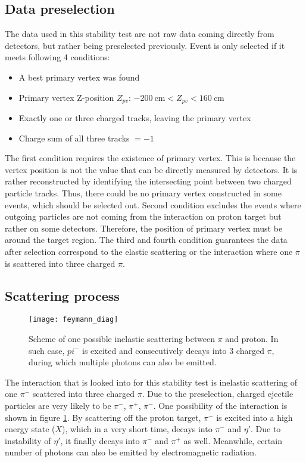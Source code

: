 \subsection{Data preselection}
\label{subsec:data_preselection}
The data used in this stability test are not raw data coming directly from detectors, but rather being preselected previously. Event is only selected if it meets following 4 conditions: 
\begin{itemize}
	\item A best primary vertex was found
	\item Primary vertex Z-position $Z_{pv}$: $\SI{-200}{\centi\meter} < Z_{pv} < \SI{160}{\centi\meter}$
	\item Exactly one or three charged tracks, leaving the primary vertex
	\item Charge sum of all three tracks $= -1$
\end{itemize}
The first condition requires the existence of primary vertex. This is because the vertex position is not the value that can be directly measured by detectors. It is rather reconstructed by identifying the intersecting point between two charged particle tracks. Thus, there could be no primary vertex constructed in some events, which should be selected out. Second condition excludes the events where outgoing particles are not coming from the interaction on proton target but rather on some detectors. Therefore, the position of primary vertex must be around the target region. The third and fourth condition guarantees the data after selection correspond to the elastic scattering or the interaction where one $\pi$ is scattered into three charged $\pi$.

\subsection{Scattering process}
\label{subsec:photon}
\begin{figure}[thb]
	\centering
	\texttt{[image: feymann\_diag]}
	\caption{Scheme of one possible inelastic scattering between $\pi$ and proton. In such case, $pi^-$ is excited and consecutively decays into 3 charged $\pi$, during which multiple photons can also be emitted.}
	\label{fig:feymann_diag}
\end{figure}

The interaction that is looked into for this stability test is inelastic scattering of one $\pi^-$ scattered into three charged $\pi$. Due to the preselection, charged ejectile particles are very likely to be $\pi^-$, $\pi^+$, $\pi^-$.  One possibility of the interaction is shown in figure \ref{fig:feymann_diag}. By scattering off the proton target, $\pi^-$ is excited into a high energy state ($X$), which in a very short time, decays into $\pi^-$ and $\eta'$. Due to instability of $\eta'$, it finally decays into $\pi^-$ and $\pi^+$ as well. Meanwhile, certain number of photons can also be emitted by electromagnetic radiation. 